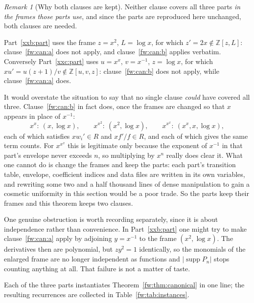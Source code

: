 \documentclass[11pt,a4paper]{article}
\numberwithin{equation}{section}
\theoremstyle{definition}
\theoremstyle{remark}
\newtheorem{remark}[theorem]{Remark}
\theoremstyle{plain}
\DeclareMathOperator{\supp}{supp}
\newcommand{\Z}{\mathbb Z}
\begin{document}
\begin{remark}[Why both clauses are kept]\label{fw:rem:twoforms}
Neither clause covers all three parts \emph{in the frames those parts use}, and
since the parts are reproduced here unchanged, both clauses are needed.

Part~\ref{xxb:part} uses the frame $z=x^2$, $L=\log x$, for which
$z'=2x\notin\Z[z,L]$: clause~\ref{fw:can:a} does not apply, and
clause~\ref{fw:can:b} applies verbatim.  Conversely Part~\ref{xxc:part} uses
$u=x^x$, $v=x^{-1}$, $z=\log x$, for which $xu'=u(z+1)/v\notin\Z[u,v,z]$:
clause~\ref{fw:can:b} does not apply, while clause~\ref{fw:can:a} does.

It would overstate the situation to say that no single clause \emph{could} have
covered all three.  Clause~\ref{fw:can:b} in fact does, once the frames are
changed so that $x$ appears in place of $x^{-1}$:
\[
 x^x:\ (x,\log x),\qquad x^{x^2}:\ (x^2,\log x),\qquad x^{x^x}:\ (x^x,x,\log x),
\]
each of which satisfies $xw_i'\in R$ and $xf'/f\in R$, and each of which gives
the same term counts.  For $x^{x^x}$ this is legitimate only because the
exponent of $x^{-1}$ in that part's envelope never exceeds $n$, so multiplying
by $x^{n}$ really does clear it.  What one cannot do is change the frames and
keep the parts: each part's transition table, envelope, coefficient indices and
data files are written in its own variables, and rewriting some two and a half
thousand lines of dense manipulation to gain a cosmetic uniformity in this
section would be a poor trade.  So the parts keep their frames and this theorem
keeps two clauses.

One genuine obstruction is worth recording separately, since it is about
independence rather than convenience.  In Part~\ref{xxb:part} one might try to
make clause~\ref{fw:can:a} apply by adjoining $y=x^{-1}$ to the frame
$(x^2,\log x)$.  The derivatives then are polynomial, but $zy^2=1$ identically,
so the monomials of the enlarged frame are no longer independent as functions
and $|\supp P_n|$ stops counting anything at all.  That failure is not a matter
of taste.
\end{remark}

Each of the three parts instantiates Theorem~\ref{fw:thm:canonical} in one line;
the resulting recurrences are collected in Table~\ref{fw:tab:instances}.
\end{document}
